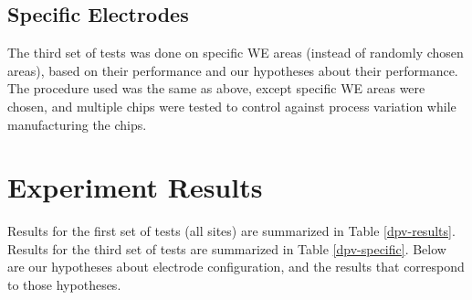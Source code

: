 \subsection{Specific Electrodes}

The third set of tests was done on specific WE areas (instead of randomly chosen areas), based on their performance and our hypotheses about their performance. The procedure used was the same as above, except specific WE areas were chosen, and multiple chips were tested to control against process variation while manufacturing the chips.

\section{Experiment Results}

Results for the first set of tests (all sites) are summarized in Table \ref{dpv-results}. Results for the third set of tests are summarized in Table \ref{dpv-specific}. Below are our hypotheses about electrode configuration, and the results that correspond to those hypotheses.

